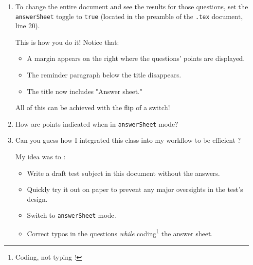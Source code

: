 \documentclass[12pt,code]{HSP-Test}
\begin{document}
	\begin{enumerate}[label=\bfseries\arabic*.]
		\item To change the entire document and see the results for those questions, set the \texttt{answerSheet} toggle to \texttt{true} (located in the preamble of the \texttt{.tex} document, line 20).
		\begin{answer}
			This is how you do it! Notice that:
			\begin{itemize}
				\item A margin appears on the right where the questions' points are displayed.
				\item The reminder paragraph below the title disappears.
				\item The title now includes "Answer sheet."
			\end{itemize}
			
			All of this can be achieved with the flip of a switch!
		\end{answer}
	
		\item How are points indicated when in \texttt{answerSheet} mode?
	
		\item Can you guess how I integrated this class into my workflow to be efficient ?
		\begin{answer}
			My idea was to :
			\begin{itemize}
				\item Write a draft test subject in this document without the answers.
				\item Quickly try it out on paper to prevent any major oversights in the test's design.
				\item Switch to \texttt{answerSheet} mode.
				\item Correct typos in the questions \emph{while} coding\footnote{Coding, not typing !} the answer sheet.
			\end{itemize}
			

\end{answer}
\end{enumerate}
\end{document}
